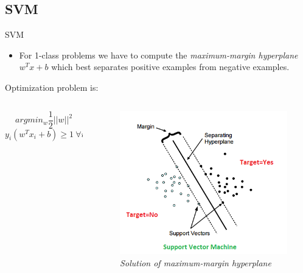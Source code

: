\subsection{SVM}
\begin{frame}{SVM}
	\begin{itemize}\setlength\itemsep{1em}
		\item For 1-class problems we have to compute the \textit{maximum-margin hyperplane} $w^Tx + b$ which best separates positive examples from negative examples.
	\end{itemize}
	Optimization problem is:
	\begin{columns}
		\begin{column}{0.5\textwidth}\centering
			$$arg min_w \frac{1}{2} ||w||^2$$
			$$y_i (w^T x_i + b) \geq 1 \ \forall i \in [1, n]$$
		\end{column}
		\begin{column}{0.5\textwidth}\centering
			\begin{figure}[htbp]
				\centering
				\includegraphics[scale = 0.40]{./images/optimal-hyperplane2.png}
				\caption{\textit{Solution of maximum-margin hyperplane}}
			\end{figure}
		\end{column}
	\end{columns}
	
	
	
\end{frame}

